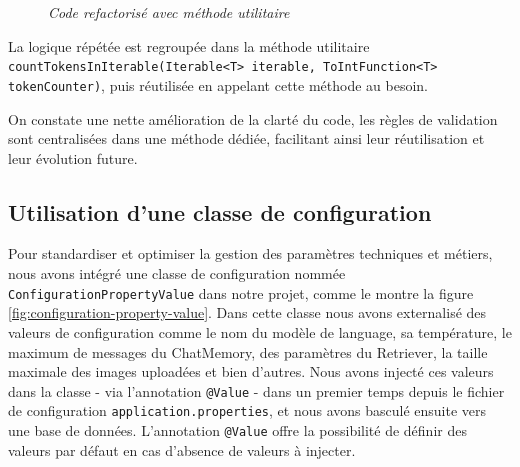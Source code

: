 \documentclass[12pt,a4paper]{report}
\begin{document}
	\begin{figure}[H]
		\centering
		\caption{\textit{Code refactorisé avec méthode utilitaire}}
		\label{fig:after-factorisation}
	\end{figure}
	
	La logique répétée est regroupée dans la méthode utilitaire \\ \verb|countTokensInIterable(Iterable<T> iterable, ToIntFunction<T> tokenCounter)|, puis réutilisée en appelant cette méthode au besoin.
	
	On constate une nette amélioration de la clarté du code, les règles de validation sont centralisées dans une méthode dédiée, facilitant ainsi leur réutilisation et leur évolution future.
	
	\subsection{Utilisation d'une classe de configuration}
	
	Pour standardiser et optimiser la gestion des paramètres techniques et métiers, nous avons intégré une classe de configuration nommée \verb|ConfigurationPropertyValue| dans notre projet, comme le montre la figure \ref{fig:configuration-property-value}. Dans cette classe nous avons externalisé des valeurs de configuration comme le nom du modèle de language, sa température, le maximum de messages du ChatMemory, des paramètres du Retriever, la taille maximale des images uploadées et bien d'autres. Nous avons injecté ces valeurs dans la classe - via l'annotation \verb|@Value| - dans un premier temps depuis le fichier de configuration \verb|application.properties|, et nous avons basculé ensuite vers une base de données. L'annotation \verb|@Value| offre la possibilité de définir des valeurs par défaut en cas d'absence de valeurs à injecter.
	
\end{document}
